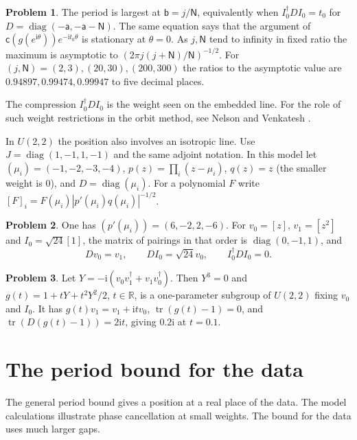 \documentclass[reqno]{amsart}
\theoremstyle{definition}
\newtheorem{problem}{Problem}[section]
\theoremstyle{plain}
\theoremstyle{remark}
\newcommand{\R}{\mathbb R}
\newcommand{\ii}{\mathrm i}
\newcommand{\cf}{\mathsf c}
\newcommand{\diag}{\operatorname{diag}}
\newcommand{\tr}{\operatorname{tr}}
\begin{document}
\begin{problem}\label{pr:circle}
The period is largest at \(\mathsf b=j/\mathsf N\), equivalently when
\(I_0^\dagger D I_0=t_0\) for \(D=\diag(-\mathsf a,-\mathsf a-\mathsf N)\).  The same equation says that the argument of \(\cf(g(e^{\ii\theta}))e^{-\ii t_0\theta}\) is stationary at \(\theta=0\).  As \(j,\mathsf N\) tend to infinity in fixed ratio the maximum is asymptotic to \((2\pi j(j+\mathsf N)/\mathsf N)^{-1/2}\).  For \((j,\mathsf N)=(2,3),(20,30),(200,300)\) the ratios to the asymptotic value are \(0.94897,0.99474,0.99947\) to five decimal places.
\end{problem}

The compression \(I_0^\dagger D I_0\) is the weight seen on the embedded line.  For the role of such weight restrictions in the orbit method, see Nelson and Venkatesh \cite{NV}.

In \(U(2,2)\) the position also involves an isotropic line.  Use \(J=\diag(1,-1,1,-1)\) and the same adjoint notation.  In this model let \((\mu_i)=(-1,-2,-3,-4)\), \(p(z)=\prod_i(z-\mu_i)\), \(q(z)=z\) (the smaller weight is \(0\)), and \(D=\diag(\mu_i)\).  For a polynomial \(F\) write \([F]_i=F(\mu_i)|p'(\mu_i)q(\mu_i)|^{-1/2}\).

\begin{problem}\label{pr:flag}
One has \((p'(\mu_i))=(6,-2,2,-6)\).  For \(v_0=[z]\), \(v_1=[z^2]\) and \(I_0=\sqrt{24}[1]\), the matrix of pairings in that order is \(\diag(0,-1,1)\), and
\[
 Dv_0=v_1,\qquad DI_0=\sqrt{24}v_0,\qquad I_0^\dagger DI_0=0 .
\]
\end{problem}

\begin{problem}\label{pr:flag-phase}
Let \(Y=-\ii(v_0v_1^\dagger+v_1v_0^\dagger)\).  Then \(Y^3=0\) and \(g(t)=1+tY+t^2Y^2/2\), \(t\in\R\), is a one-parameter subgroup of \(U(2,2)\) fixing \(v_0\) and \(I_0\).  It has \(g(t)v_1=v_1+\ii t v_0\), \(\tr(g(t)-1)=0\), and \(\tr(D(g(t)-1))=2\ii t\), giving \(0.2\ii\) at \(t=0.1\).
\end{problem}

\section{The period bound for the data}\label{sec:period}

The general period bound gives a position at a real place of the data.  The model calculations illustrate phase cancellation at small weights.  The bound for the data uses much larger gaps.
\end{document}
